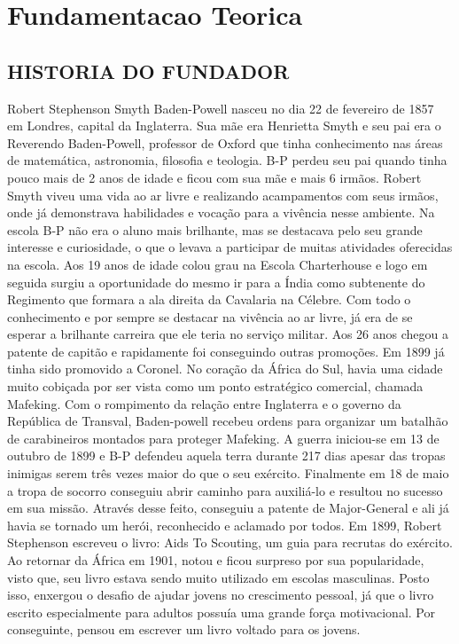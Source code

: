 \chapter{Fundamentacao Teorica}
\section{HISTORIA DO FUNDADOR}
\hspace*{0.5cm}Robert Stephenson Smyth Baden-Powell nasceu no dia 22 de fevereiro de 1857 em Londres, capital da Inglaterra. Sua mãe era Henrietta Smyth e seu pai era o Reverendo Baden-Powell, professor de Oxford que tinha conhecimento nas áreas de matemática, astronomia, filosofia e teologia. B-P perdeu seu pai quando tinha pouco mais de 2 anos de idade e ficou com sua mãe e mais 6 irmãos.
\hspace*{0.5cm}Robert Smyth viveu uma vida ao ar livre e realizando acampamentos com seus irmãos, onde já demonstrava habilidades e vocação para a vivência nesse ambiente. Na escola B-P não era o aluno mais brilhante, mas se destacava pelo seu grande interesse e curiosidade, o que o levava a participar de muitas atividades oferecidas na escola. Aos 19 anos de idade colou grau na Escola Charterhouse e logo em seguida surgiu a oportunidade do mesmo ir para a Índia como subtenente do Regimento que formara a ala direita da Cavalaria na Célebre.
\hspace*{0.5cm}Com todo o conhecimento e por sempre se destacar na vivência ao ar livre, já era de se esperar a brilhante carreira que ele teria no serviço militar. Aos 26 anos chegou a patente de capitão e rapidamente foi conseguindo outras promoções. Em 1899 já tinha sido promovido a Coronel.
\hspace*{0.5cm}No coração da África do Sul, havia uma cidade muito cobiçada por ser vista como um ponto estratégico comercial, chamada Mafeking. Com o rompimento da relação entre Inglaterra e o governo da República de Transval, Baden-powell recebeu ordens para organizar um batalhão de carabineiros montados para proteger Mafeking. A guerra iniciou-se em 13 de outubro de 1899 e B-P defendeu aquela terra durante 217 dias apesar das tropas inimigas serem três vezes maior do que o seu exército. Finalmente em 18 de maio a tropa de socorro conseguiu abrir caminho para auxiliá-lo e resultou no sucesso em sua missão. Através desse feito, conseguiu a patente de Major-General e ali já havia se tornado um herói, reconhecido e aclamado por todos.
\hspace*{0.5cm}Em 1899, Robert Stephenson escreveu o livro: Aids To Scouting, um guia para recrutas do exército. Ao retornar da África em 1901, notou e ficou surpreso por sua popularidade, visto que, seu livro estava sendo muito utilizado em escolas masculinas. Posto isso, enxergou o desafio de ajudar jovens no crescimento pessoal, já que o livro escrito especialmente para adultos possuía uma grande força motivacional. Por conseguinte, pensou em escrever um livro voltado para os jovens.
